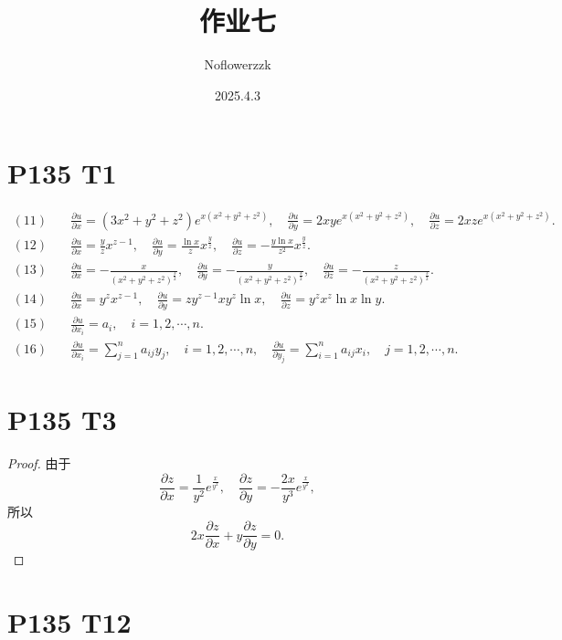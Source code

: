 \documentclass{article}
\title{作业七}
\author{Noflowerzzk}
\date{2025.4.3}
\begin{document}
\maketitle

\section*{P135 T1}

\begin{align*}
    (11) & \quad \frac{\partial u}{\partial x} = (3x^2 + y^2 + z^2) e^{x(x^2 + y^2 + z^2)}, \quad \frac{\partial u}{\partial y} = 2xy e^{x(x^2 + y^2 + z^2)}, \quad \frac{\partial u}{\partial z} = 2xz e^{x(x^2 + y^2 + z^2)}. \\
    (12) & \quad \frac{\partial u}{\partial x} = \frac{y}{z} x^{z-1}, \quad \frac{\partial u}{\partial y} = \frac{\ln x}{z} x^{\frac{y}{z}}, \quad \frac{\partial u}{\partial z} = -\frac{y \ln x}{z^2} x^{\frac{y}{z}}. \\
    (13) & \quad \frac{\partial u}{\partial x} = -\frac{x}{(x^2 + y^2 + z^2)^{\frac{3}{2}}}, \quad \frac{\partial u}{\partial y} = -\frac{y}{(x^2 + y^2 + z^2)^{\frac{3}{2}}}, \quad \frac{\partial u}{\partial z} = -\frac{z}{(x^2 + y^2 + z^2)^{\frac{3}{2}}}. \\
    (14) & \quad \frac{\partial u}{\partial x} = y^z x^{z-1}, \quad \frac{\partial u}{\partial y} = z y^{z-1} x y^z \ln x, \quad \frac{\partial u}{\partial z} = y^z x^z \ln x \ln y. \\
    (15) & \quad \frac{\partial u}{\partial x_i} = a_i, \quad i = 1, 2, \cdots, n. \\
    (16) & \quad \frac{\partial u}{\partial x_i} = \sum_{j=1}^{n} a_{ij} y_j, \quad i = 1, 2, \cdots, n, \quad \frac{\partial u}{\partial y_j} = \sum_{i=1}^{n} a_{ij} x_i, \quad j = 1, 2, \cdots, n.
\end{align*}

\section*{P135 T3}

\begin{proof}
    由于
    $$
        \frac{\partial z}{\partial x} = \frac{1}{y^2} e^{\frac{x}{y^2}}, \quad \frac{\partial z}{\partial y} = -\frac{2x}{y^3} e^{\frac{x}{y^2}},
    $$ 
    所以
    $$
        2x \frac{\partial z}{\partial x} + y \frac{\partial z}{\partial y} = 0.
    $$ 
\end{proof}

\section*{P135 T12}
\end{document}

